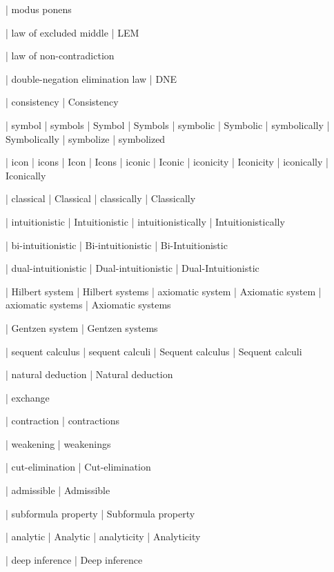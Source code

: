  | modus ponens

 | law of excluded middle
 | LEM

 | law of non-contradiction

 | double-negation elimination law
 | DNE

 | consistency
 | Consistency

 | symbol
 | symbols
 | Symbol
 | Symbols
 | symbolic
 | Symbolic
 | symbolically
 | Symbolically
 | symbolize
 | symbolized

 | icon
 | icons
 | Icon
 | Icons
 | iconic
 | Iconic
 | iconicity
 | Iconicity
 | iconically
 | Iconically
 
 | classical
 | Classical
 | classically
 | Classically

 | intuitionistic
 | Intuitionistic
 | intuitionistically
 | Intuitionistically

 | bi-intuitionistic
 | Bi-intuitionistic
 | Bi-Intuitionistic

 | dual-intuitionistic
 | Dual-intuitionistic
 | Dual-Intuitionistic

 | Hilbert system
 | Hilbert systems
 | axiomatic system
 | Axiomatic system
 | axiomatic systems
 | Axiomatic systems

 | Gentzen system
 | Gentzen systems

 | sequent calculus
 | sequent calculi
 | Sequent calculus
 | Sequent calculi

 | natural deduction
 | Natural deduction

 | exchange

 | contraction
 | contractions

 | weakening
 | weakenings

 | cut-elimination
 | Cut-elimination

 | admissible
 | Admissible

 | subformula property
 | Subformula property

 | analytic
 | Analytic
 | analyticity
 | Analyticity

 | deep inference
 | Deep inference

